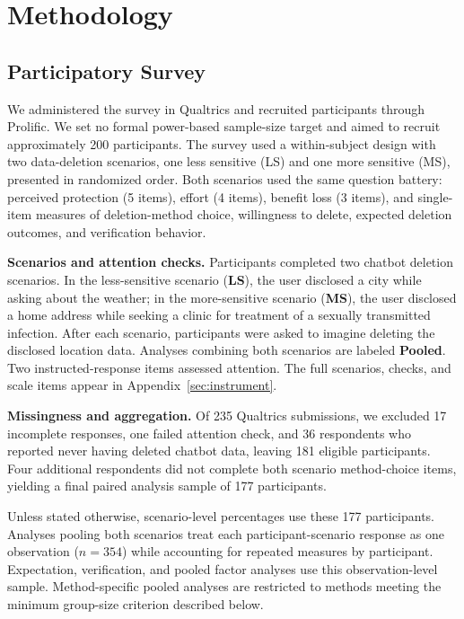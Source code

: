 \documentclass[conference,compsoc]{IEEEtran}
\begin{document}
\section{Methodology}
\label{sec:methodology}

\subsection{Participatory Survey}
\label{sec:survey-methodology}
We administered the survey in Qualtrics and recruited participants through Prolific. We set no formal power-based sample-size target and aimed to recruit approximately 200 participants. The survey used a within-subject design with two data-deletion scenarios, one less sensitive (LS) and one more sensitive (MS), presented in randomized order. Both scenarios used the same question battery: perceived protection (5 items), effort (4 items), benefit loss (3 items), and single-item measures of deletion-method choice, willingness to delete, expected deletion outcomes, and verification behavior.

\textbf{Scenarios and attention checks.} Participants completed two chatbot deletion scenarios. In the less-sensitive scenario (\textbf{LS}), the user disclosed a city while asking about the weather; in the more-sensitive scenario (\textbf{MS}), the user disclosed a home address while seeking a clinic for treatment of a sexually transmitted infection. After each scenario, participants were asked to imagine deleting the disclosed location data. Analyses combining both scenarios are labeled \textbf{Pooled}. Two instructed-response items assessed attention. The full scenarios, checks, and scale items appear in Appendix~\ref{sec:instrument}.

\textbf{Missingness and aggregation.} Of 235 Qualtrics submissions, we excluded 17 incomplete responses, one failed attention check, and 36 respondents who reported never having deleted chatbot data, leaving 181 eligible participants. Four additional respondents did not complete both scenario method-choice items, yielding a final paired analysis sample of 177 participants.

Unless stated otherwise, scenario-level percentages use these 177 participants. Analyses pooling both scenarios treat each participant-scenario response as one observation ($n=354$) while accounting for repeated measures by participant. Expectation, verification, and pooled factor analyses use this observation-level sample. Method-specific pooled analyses are restricted to methods meeting the minimum group-size criterion described below.
\end{document}
